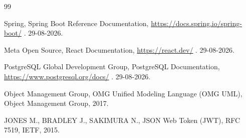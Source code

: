 \begin{thebibliography}{99}

Spring, Spring Boot Reference Documentation, \url{https://docs.spring.io/spring-boot/} . 29-08-2026.

Meta Open Source, React Documentation, \url{https://react.dev/} . 29-08-2026.

PostgreSQL Global Development Group, PostgreSQL Documentation, \url{https://www.postgresql.org/docs/} . 29-08-2026.

Object Management Group, OMG Unified Modeling Language (OMG UML), Object Management Group, 2017.

JONES M., BRADLEY J., SAKIMURA N., JSON Web Token (JWT), RFC 7519, IETF, 2015.

\end{thebibliography}
